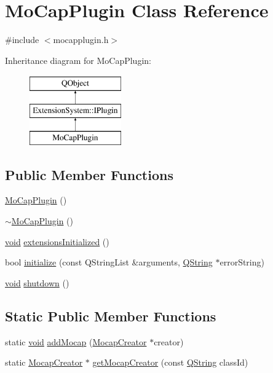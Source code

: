 \hypertarget{class_mo_cap_plugin}{\section{Mo\-Cap\-Plugin Class Reference}
\label{class_mo_cap_plugin}
}


{\ttfamily \#include $<$mocapplugin.\-h$>$}

Inheritance diagram for Mo\-Cap\-Plugin\-:\begin{figure}[H]
\begin{center}
\leavevmode
\includegraphics[height=3.000000cm]{class_mo_cap_plugin}
\end{center}
\end{figure}
\subsection*{Public Member Functions}
\begin{DoxyCompactItemize}
\item 
\hyperlink{group___mo_cap_plugin_gae4dfd9a9bb3746b1311deb0968382442}{Mo\-Cap\-Plugin} ()
\item 
\hyperlink{group___mo_cap_plugin_gae35a57590fd1156a31b514641702fb0e}{$\sim$\-Mo\-Cap\-Plugin} ()
\item 
\hyperlink{group___u_a_v_objects_plugin_ga444cf2ff3f0ecbe028adce838d373f5c}{void} \hyperlink{group___mo_cap_plugin_ga44d4c75032b9cb5698f876ff3cee5e09}{extensions\-Initialized} ()
\item 
bool \hyperlink{group___mo_cap_plugin_ga91a5975a6eb4f0771b265669e68b9732}{initialize} (const Q\-String\-List \&arguments, \hyperlink{group___u_a_v_objects_plugin_gab9d252f49c333c94a72f97ce3105a32d}{Q\-String} $\ast$error\-String)
\item 
\hyperlink{group___u_a_v_objects_plugin_ga444cf2ff3f0ecbe028adce838d373f5c}{void} \hyperlink{group___mo_cap_plugin_ga6ceccf865e672ec6799046772bb33346}{shutdown} ()
\end{DoxyCompactItemize}
\subsection*{Static Public Member Functions}
\begin{DoxyCompactItemize}
\item 
static \hyperlink{group___u_a_v_objects_plugin_ga444cf2ff3f0ecbe028adce838d373f5c}{void} \hyperlink{group___mo_cap_plugin_ga6af38b170105a0cbf49fcd99f3765f76}{add\-Mocap} (\hyperlink{class_mocap_creator}{Mocap\-Creator} $\ast$creator)
\item 
static \hyperlink{class_mocap_creator}{Mocap\-Creator} $\ast$ \hyperlink{group___mo_cap_plugin_ga1d86e516f13c5ef45cf76400e74fe8e5}{get\-Mocap\-Creator} (const \hyperlink{group___u_a_v_objects_plugin_gab9d252f49c333c94a72f97ce3105a32d}{Q\-String} class\-Id)
\end{DoxyCompactItemize}
